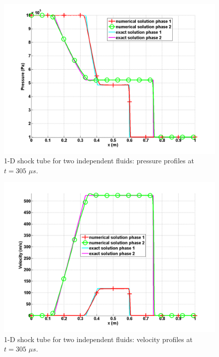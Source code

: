 \begin{figure}[H]
\centering
\includegraphics[width=\textwidth]{figures/SEM/two_phases_pressure.png}
\caption{1-D shock tube for two independent fluids: pressure profiles at $t=305$ $\mu s$.}
\label{fig:two-indep-fluids-press-7-eqn-sect4}
\end{figure}
%
\begin{figure}[H]
\centering
\includegraphics[width=\textwidth]{figures/SEM/two_phases_velocity.png}
\caption{1-D shock tube for two independent fluids: velocity profiles at $t=305$ $\mu s$.}
\label{fig:two-indep-fluids-vel-7-eqn-sect4}
\end{figure}
%

